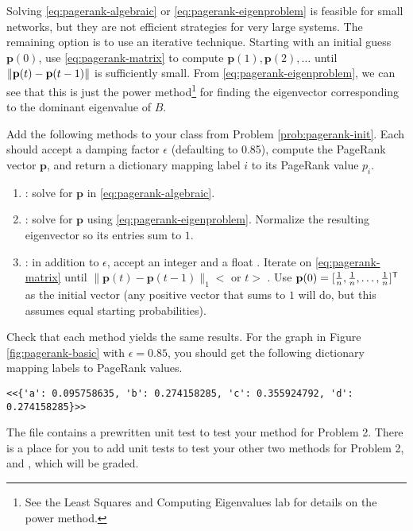 Solving \eqref{eq:pagerank-algebraic} or \eqref{eq:pagerank-eigenproblem} is feasible for small networks, but they are not efficient strategies for very large systems.
The remaining option is to use an iterative technique.
Starting with an initial guess $\mathbf{p}(0)$, use  \eqref{eq:pagerank-matrix} to compute $\mathbf{p}(1),\mathbf{p}(2),\ldots$ until $\left\lVert\mathbf{p}(t)-\mathbf{p}(t-1)\right\rVert$ is sufficiently small.
From \eqref{eq:pagerank-eigenproblem}, we can see that this is just the power method\footnote{See the Least Squares and Computing Eigenvalues lab for details on the power method.} for finding the eigenvector corresponding to the dominant eigenvalue of $B$.

\begin{problem} %
Add the following methods to your class from Problem \ref{prob:pagerank-init}.
Each should accept a damping factor $\epsilon$ (defaulting to 0.85), compute the PageRank vector $\mathbf{p}$, and return a dictionary mapping label $i$ to its PageRank value $p_i$.

\begin{enumerate}
\item {}: solve for $\mathbf{p}$ in \eqref{eq:pagerank-algebraic}.
\item {}: solve for $\mathbf{p}$ using \eqref{eq:pagerank-eigenproblem}.
Normalize the resulting eigenvector so its entries sum to $1$.
\item {}: in addition to $\epsilon$, accept an integer  and a float .
Iterate on \eqref{eq:pagerank-matrix} until $\|\mathbf{p}(t) - \mathbf{p}(t-1)\|_1 < $  or $t > $ .
Use $\mathbf{p}(0)=[\frac{1}{n},\frac{1}{n},\ldots,\frac{1}{n}]^{\mathsf T}$ as the initial vector (any positive vector that sums to $1$ will do, but this assumes equal starting probabilities).
\end{enumerate}
Check that each method yields the same results.
For the graph in Figure \ref{fig:pagerank-basic} with $\epsilon=0.85$, you should get the following dictionary mapping labels to PageRank values.
\begin{lstlisting}
<<{'a': 0.095758635, 'b': 0.274158285, 'c': 0.355924792, 'd': 0.274158285}>>
\end{lstlisting}
\label{prob:pagerank-computation}
\end{problem}

\begin{unittest}
The file  contains a prewritten unit test to test your  method for Problem 2.
There is a place for you to add unit tests to test your other two methods for Problem 2,  and , which will be graded.
\end{unittest}

